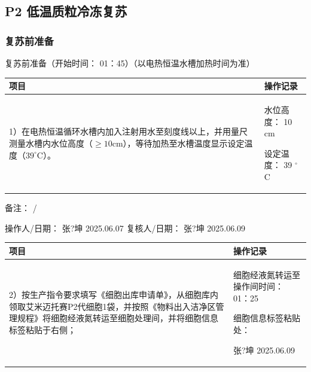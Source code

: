 \documentclass[UTF8,10pt,a4paper,fontset=fandol]{ctexart}
\newcommand{\fieldvalue}[1]{#1}
\newcommand{\handwritten}[1]{#1}
\begin{document}
\subsection{P2 低温质粒冷冻复苏}

\subsubsection{复苏前准备}

复苏前准备（开始时间：%
\fieldvalue{\handwritten{01：45}}）（以电热恒温水槽加热时间为准）

\begin{tabularx}{\textwidth}{|X|X|}
\hline
项目 & 操作记录 \\
\hline
1）在电热恒温循环水槽内加入注射用水至刻度线以上，并用量尺测量水槽内水位高度（$\geq 10\mathrm{cm}$），等待加热至水槽温度显示设定温度（$39^\circ\mathrm{C}$）。 &
水位高度：%
\fieldvalue{\handwritten{10}} cm

设定温度：%
\fieldvalue{\handwritten{39}} $^\circ$C \\
\hline
\end{tabularx}

备注：%
\fieldvalue{\handwritten{/}}

\noindent
操作人/日期：%
\fieldvalue{\handwritten{张?坤}}\quad
\fieldvalue{\handwritten{2025.06.07}}
\hfill
复核人/日期：%
\fieldvalue{\handwritten{张?坤}}\quad
\fieldvalue{\handwritten{2025.06.09}}

\begin{tabularx}{\textwidth}{|X|X|}
\hline
项目 & 操作记录 \\
\hline
2）按生产指令要求填写《细胞出库申请单》，从细胞库内领取艾米迈托赛P2代细胞1袋，并按照《物料出入洁净区管理规程》将细胞经液氮转运至细胞处理间，并将细胞信息标签粘贴于右侧； &
细胞经液氮转运至操作间时间：%
\fieldvalue{\handwritten{01：25}}

细胞信息标签粘贴处：


\fieldvalue{\handwritten{张?坤}}\quad
\fieldvalue{\handwritten{2025.06.09}} \\
\hline
\end{tabularx}
\end{document}
